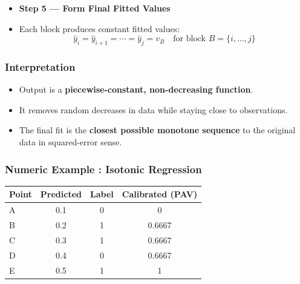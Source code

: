 \documentclass[10pt,a4paper]{article}
\begin{document}
	\begin{itemize}
		\item \textbf{Step 5 — Form Final Fitted Values}
		\item Each block produces constant fitted values:
		$$ \hat{y}_i = \hat{y}_{i+1} = \cdots = \hat{y}_j = v_B \quad \text{for block } B = \{i,\ldots,j\} $$
	\end{itemize}


	\subsubsection{Interpretation}

	\begin{itemize}
		\item Output is a \textbf{piecewise-constant, non-decreasing function}.
		\item It removes random decreases in data while staying close to observations.
		\item The final fit is the \textbf{closest possible monotone sequence} to the original data in squared-error sense.
	\end{itemize}

	\subsubsection{Numeric Example : Isotonic Regression}

	\begin{center}
		\begin{tabular}{lccc}
			\toprule
			Point & Predicted & Label & Calibrated (PAV) \\
			\midrule
			A & 0.1 & 0 & 0 \\
			B & 0.2 & 1 & 0.6667 \\
			C & 0.3 & 1 & 0.6667 \\
			D & 0.4 & 0 & 0.6667 \\
			E & 0.5 & 1 & 1 \\
			\bottomrule
		\end{tabular}
	\end{center}
\end{document}
